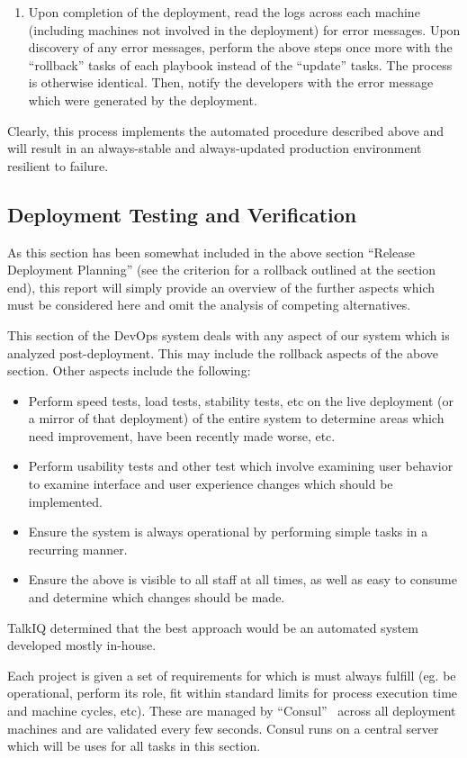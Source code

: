 \documentclass[12pt]{article}
\begin{document}
\begin{enumerate}
\item Upon completion of the deployment, read the logs across each machine (including machines not involved in the deployment) for error messages. Upon discovery of any error messages, perform the above steps once more with the ``rollback'' tasks of each playbook instead of the ``update'' tasks. The process is otherwise identical. Then, notify the developers with the error message which were generated by the deployment.
\end{enumerate}

Clearly, this process implements the automated procedure described above and will result in an always-stable and always-updated production environment resilient to failure.

\subsection{Deployment Testing and Verification}
As this section has been somewhat included in the above section ``Release Deployment Planning'' (see the criterion for a rollback outlined at the section end), this report will simply provide an overview of the further aspects which must be considered here and omit the analysis of competing alternatives.

This section of the DevOps system deals with any aspect of our system which is analyzed post-deployment. This may include the rollback aspects of the above section. Other aspects include the following:
\begin{itemize}
\item Perform speed tests, load tests, stability tests, etc on the live deployment (or a mirror of that deployment) of the entire system to determine areas which need improvement, have been recently made worse, etc.
\item Perform usability tests and other test which involve examining user behavior to examine interface and user experience changes which should be implemented.
\item Ensure the system is always operational by performing simple tasks in a recurring manner.
\item Ensure the above is visible to all staff at all times, as well as easy to consume and determine which changes should be made.
\end{itemize}

TalkIQ determined that the best approach would be an automated system developed mostly in-house.

Each project is given a set of requirements for which is must always fulfill (eg. be operational, perform its role, fit within standard limits for process execution time and machine cycles, etc). These are managed by ``Consul''~\cite{consul} across all deployment machines and are validated every few seconds. Consul runs on a central server which will be uses for all tasks in this section.
\end{document}
